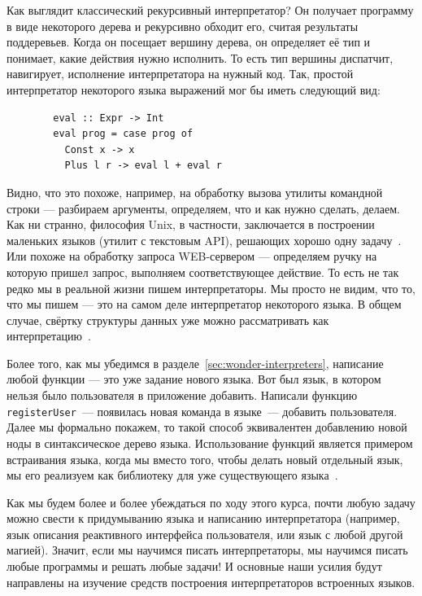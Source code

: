 \documentclass[12pt]{article}
\begin{document}
    Как выглядит классический рекурсивный интерпретатор?
    Он получает программу в виде некоторого дерева и рекурсивно обходит его, считая результаты поддеревьев.
    Когда он посещает вершину дерева, он определяет её тип и понимает, какие действия нужно исполнить.
    То есть тип вершины диспатчит, навигирует, исполнение интерпретатора на нужный код.
    Так, простой интерпретатор некоторого языка выражений мог бы иметь следующий вид:
    \begin{verbatim}
        eval :: Expr -> Int
        eval prog = case prog of
          Const x -> x
          Plus l r -> eval l + eval r
    \end{verbatim}

    Видно, что это похоже, например, на обработку вызова утилиты командной строки --- разбираем аргументы, определяем, что и как нужно сделать, делаем.
    Как ни странно, философия Unix, в частности, заключается в построении маленьких языков (утилит с текстовым API), решающих хорошо одну задачу~\cite{bentley1986little}.
    Или похоже на обработку запроса WEB-сервером --- определяем ручку на которую пришел запрос, выполняем соответствующее действие.
    То есть не так редко мы в реальной жизни пишем интерпретаторы.
    Мы просто не видим, что то, что мы пишем --- это на самом деле интерпретатор некоторого языка.
    В общем случае, свёртку структуры данных уже можно рассматривать как интерпретацию~\cite{gibbons2014folding}.

    Более того, как мы убедимся в разделе~\ref{sec:wonder-interpreters}, написание любой функции --- это уже задание нового языка.
    Вот был язык, в котором нельзя было пользователя в приложение добавить.
    Написали функцию \texttt{registerUser}~--- появилась новая команда в языке~--- добавить пользователя.
    Далее мы формально покажем, то такой способ эквивалентен добавлению новой ноды в синтаксическое дерево языка.
    Использование функций является примером встраивания языка, когда мы вместо того, чтобы делать новый отдельный язык, мы его реализуем как библиотеку для уже существующего языка~\cite{gibbons2013functional}.

    Как мы будем более и более убеждаться по ходу этого курса, почти любую задачу можно свести к придумыванию языка и написанию интерпретатора (например, язык описания реактивного интерфейса пользователя, или язык с любой другой магией).
    Значит, если мы научимся писать интерпретаторы, мы научимся писать любые программы и решать любые задачи!
    И основные наши усилия будут направлены на изучение средств построения интерпретаторов встроенных языков.
\end{document}
